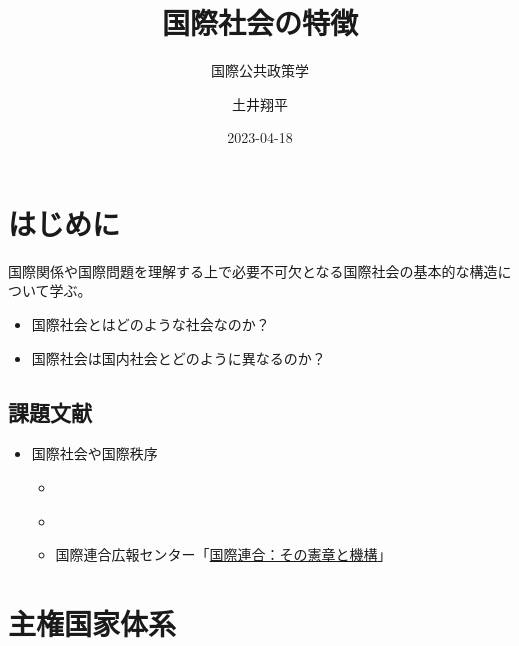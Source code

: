 \documentclass[
  xelatex,
  ja=standard]{bxjsarticle}
\title{国際社会の特徴}
\subtitle{国際公共政策学}
\author{土井翔平}
\date{2023-04-18}
\providecommand{\tightlist}{%
  \setlength{\itemsep}{0pt}\setlength{\parskip}{0pt}}\usepackage{longtable,booktabs,array}
\begin{document}
\maketitle
\ifdefined\Shaded\renewenvironment{Shaded}{\begin{tcolorbox}[enhanced, interior hidden, sharp corners, frame hidden, boxrule=0pt, borderline west={3pt}{0pt}{shadecolor}, breakable]}{\end{tcolorbox}}\fi

\hypertarget{ux306fux3058ux3081ux306b}{%
\section*{はじめに}\label{ux306fux3058ux3081ux306b}}

国際関係や国際問題を理解する上で必要不可欠となる国際社会の基本的な構造について学ぶ。

\begin{itemize}
\tightlist
\item
  国際社会とはどのような社会なのか？
\item
  国際社会は国内社会とどのように異なるのか？
\end{itemize}

\hypertarget{ux8ab2ux984cux6587ux732e}{%
\subsection*{課題文献}\label{ux8ab2ux984cux6587ux732e}}

\begin{itemize}
\tightlist
\item
  国際社会や国際秩序

  \begin{itemize}
  \tightlist
  \item
    \citet[第3章]{nakanishi2013}
  \item
    \citet{shinoda2007}
  \item
    国際連合広報センター「\href{https://www.unic.or.jp/info/un/}{国際連合：その憲章と機構}」
  \end{itemize}
\end{itemize}

\hypertarget{ux4e3bux6a29ux56fdux5bb6ux4f53ux7cfb}{%
\section{主権国家体系}\label{ux4e3bux6a29ux56fdux5bb6ux4f53ux7cfb}}
\end{document}
